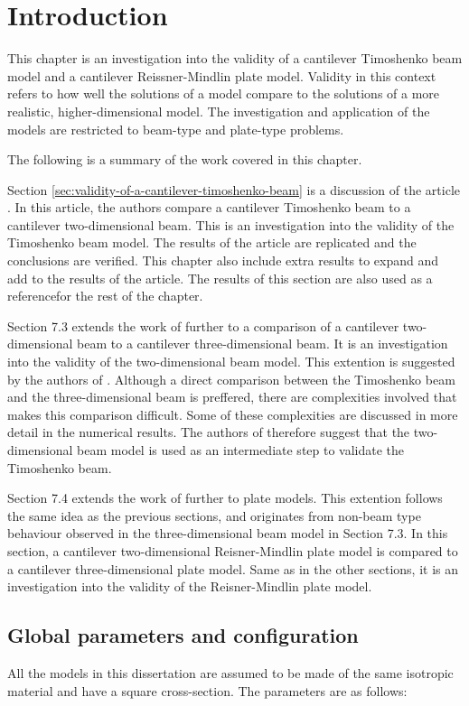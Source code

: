 \documentclass[../../main.tex]{subfiles}
\begin{document}
\section{Introduction}
This chapter is an investigation into the validity of a cantilever Timoshenko beam model and a cantilever Reissner-Mindlin plate model. Validity in this context refers to how well the solutions of a model compare to the solutions of a more realistic, higher-dimensional model. The investigation and application of the models are restricted to beam-type and plate-type problems.

The following is a summary of the work covered in this chapter.

Section \ref{sec:validity-of-a-cantilever-timoshenko-beam} is a discussion of the article \cite{LVV09}. In this article, the authors compare a cantilever Timoshenko beam to a cantilever two-dimensional beam. This is an investigation into the validity of the Timoshenko beam model. The results of the article are replicated and the conclusions are verified. This chapter also include extra results to expand and add to the results of the article. The results of this section are also used as a referencefor the rest of the chapter.

Section 7.3 extends the work of \cite{LVV09} further to a comparison of a cantilever two-dimensional beam to a cantilever three-dimensional beam. It is an investigation into the validity of the two-dimensional beam model. This extention is suggested by the authors of \cite{LVV09}. Although a direct comparison between the Timoshenko beam and the three-dimensional beam is preffered, there are complexities involved that makes this comparison difficult. Some of these complexities are discussed in more detail in the numerical results. The authors of \cite{LVV09} therefore suggest that the two-dimensional beam model is used as an intermediate step to validate the Timoshenko beam.

Section 7.4 extends the work of \cite{LVV09} further to plate models. This extention follows the same idea as the previous sections, and originates from non-beam type behaviour observed in the three-dimensional beam model in Section 7.3. In this section, a cantilever two-dimensional Reisner-Mindlin plate model is compared to a cantilever three-dimensional plate model. Same as in the other sections, it is an investigation into the validity of the Reisner-Mindlin plate model. 

\subsection{Global parameters and configuration}
All the models in this dissertation are assumed to be made of the same isotropic material and have a square cross-section. The parameters are as follows:
\end{document}
